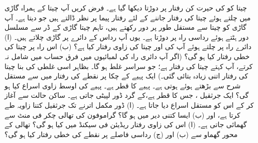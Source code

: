 چیتا  کو  کی  حیرت کن  رفتار پر دوڑتا  دیکھا گیا ہے۔ فرض کریں آپ چیتا کے ہمراہ گاڑی میں چلتے ہوئے چیتا کی رفتار جاننے کے لئے رفتار پیما پر نظر ڈالتے ہیں
 جو  دیتا ہے۔  آپ گاڑی کو چیتا سے مستقل طور پر   دور رکھتے ہیں، تاہم چیتا گاڑی  کے  ڈر سے  مسلسل دور ہٹتے ہوئے  رداسی  راہ پر دوڑتا ہے۔ یوں آپ  رداس کے دائرے پر گاڑی چلاتے ہیں۔ (ا) دائرے راہ پر  چلتے ہوئے آپ کی اور چیتا کی زاوی رفتار کیا ہے؟ (ب)  اس راہ پر چیتا کی خطی رفتار کیا ہو گی؟ (اگر آپ دائری راہ کی لمبائیوں میں فرق  حساب میں شامل نہ کرتے، آپ کہتے چیتا کی رفتار  ہے؛ جو سراسر غلط ہو گا۔ بظاہر اسی غلطی کی بنا چیتا کی رفتار اتنی زیادہ بتائی گئی۔)
ایک پہیے کے چکا پر نقطے کی رفتار  میں  سے مستقل شرح سے بڑھتے ہوئے  ہوتی ہے۔ پہیے کا  قطر   ہے۔ پہیے کی اوسط زاوی اسراع کیا ہو گی؟
ایک جرثقیل  ، جس کا  قطر  ہے،کے گرد  ڈور لپیٹی جاتی ہے۔ ساکن حالت سے آغاز کر کے اس کو   مستقل اسراع  دیا جاتا ہے۔ (ا) ڈور مکمل  اترنے تک جرثقیل کتنا زاویہ طے کرتا ہے، اور (ب) ایسا کتنی دیر میں ہو گا؟
گراموفون کی تھالی  چکر فی منٹ سے گھمائی جاتی ہے۔ (ا) اس کی زاوی رفتار ریڈیئن فی سیکنڈ میں کیا ہو گی؟ تھالی  کے محور گھماو سے   (ب)  اور (ج)  رداسی فاصلے پر نقطے کی خطی رفتار کیا ہو گی؟

